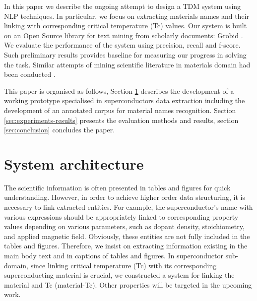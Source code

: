 \documentclass{article}[a4]
\begin{document}

In this paper we describe the ongoing attempt to design a TDM system using NLP techniques. In particular, we focus on extracting materials names and their linking with corresponding critical temperature (Tc) values.
Our system is built on an Open Source library for text mining from scholarly documents: Grobid \cite{GROBID}. We evaluate the performance of the system using precision, recall and f-score. Such preliminary results provides baseline for measuring our progress in solving the task.
Similar attempts of mining scientific literature in materials domain had been conducted \cite{nanocrystal_extraction} \cite{court2018auto}. 

This paper is organised as follows, Section \ref{sec:architecture} describes the development of a working prototype specialised in superconductors data extraction including the development of an annotated corpus for material names recognition. Section \ref{sec:experiments-results} presents the evaluation methods and results, section \ref{sec:conclusion} concludes the paper.

\section{System architecture}
\label{sec:architecture}
The scientific information is often presented in tables and figures for quick understanding. However, in order to achieve higher order data structuring, it is necessary to link extracted entities. For example, the superconductor’s name with various expressions should be appropriately linked to corresponding property values depending on various parameters, such as dopant density, stoichiometry, and applied magnetic field. Obviously, these entities are not fully included in the tables and figures. Therefore, we insist on extracting information existing in the main body text and in captions of tables and figures. In superconductor sub-domain, since linking critical temperature (Tc) with its corresponding superconducting material is crucial, we constructed a system for linking the material and Tc (material-Tc). Other properties will be targeted in the upcoming work.
\end{document}
